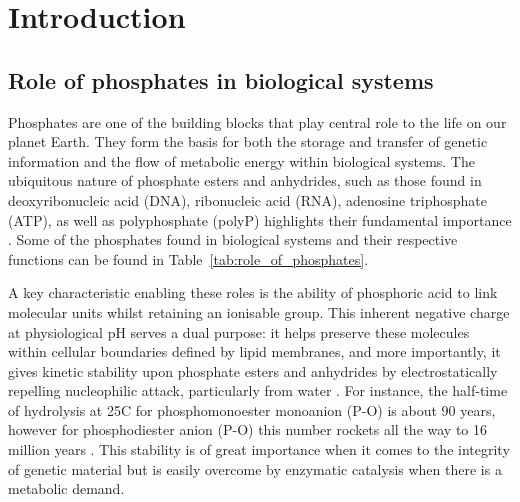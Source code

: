 \chapter{Introduction}

\section{Role of phosphates in biological systems}
Phosphates are one of the building blocks that play central role to the life on our planet Earth. They form the basis for both the storage and transfer of genetic information and the flow of metabolic energy within biological systems. The ubiquitous nature of phosphate esters and anhydrides, such as those found in deoxyribonucleic acid (DNA), ribonucleic acid (RNA), adenosine triphosphate (ATP), as well as polyphosphate (polyP) highlights their fundamental importance \citep{westheimerWhyNatureChose1987}. Some of the phosphates found in biological systems and their respective functions can be found in Table~\ref{tab:role_of_phosphates}.

A key characteristic enabling these roles is the ability of phosphoric acid to link molecular units whilst retaining an ionisable group. This inherent negative charge at physiological pH serves a dual purpose: it helps preserve these molecules within cellular boundaries defined by lipid membranes, and more importantly, it gives kinetic stability upon phosphate esters and anhydrides by electrostatically repelling nucleophilic attack, particularly from water \citep{westheimerWhyNatureChose1987}. For instance, the half-time of hydrolysis at 25\textdegree C for phosphomonoester monoanion (P-O) is about 90 years, however for phosphodiester anion (P-O) this number rockets all the way to 16 million years \citep{wolfendenDegreesDifficultyWaterConsuming2006}. This  stability is of great importance when it comes to the integrity of genetic material but is easily overcome by enzymatic catalysis when there is a metabolic demand.

